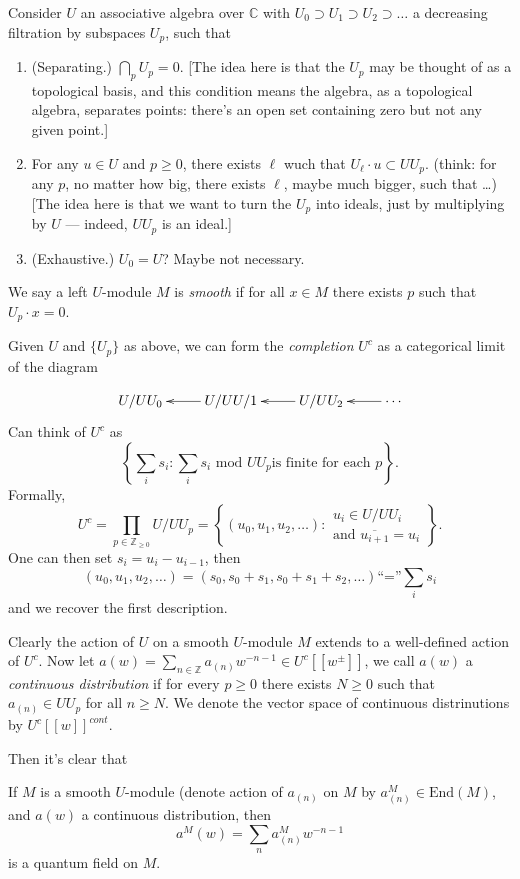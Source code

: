 Consider $U$ an associative algebra over $\mathbb{C}$ with
$U_0 \supset U_1 \supset U_2 \supset\ldots$ a decreasing
filtration by subspaces $U_p$, such that
\begin{enumerate}
\item
\label{item-separating}
(Separating.) $\bigcap_{p}U_p=0$.
[The idea here is that the $U_p$ may be thought of
as a topological basis, and this condition means
the algebra, as a topological algebra, separates points:
there's an open set containing zero but not any given point.]

\item 
\label{item-l}
For any $u \in U$ and $p\geq 0$, there exists $\ell$
wuch that  $U_\ell \cdot u \subset U U_p$.
(think: for any $p$, no matter how big,
there exists $\ell$, maybe much bigger, such that  …)
[The idea here is that we want to turn the  $U_p$ into ideals,
just by multiplying by $U$ --- indeed, $U U_p$ is an ideal.]

\item (Exhaustive.) $U_0= U$? Maybe not necessary.
\label{item-exhaustive}
\end{enumerate}

\noindent
We say a left $U$-module $M$ is {\it smooth} if
for all $x \in M$ there exists $p$ such that $U_p\cdot x=0$.

\medskip\noindent
Given $U$ and $\{U_p\}$ as above, we can form the {\it completion} $U^c$
as a categorical limit of the diagram

$$
\xymatrix{
U/U U_0&U/U U/1 \ar[l]& U/ U U_2 \ar[l]& \cdots \ar[l].
}
$$
Can think of $U^c$ as
$$
\left\{\sum_is_i:\sum_is_i\text{ mod }U U_p
\text{is finite for each $p$}\right\}.
$$
Formally,
$$
U^c=\prod_{p \in \mathbb{Z}_{\geq 0}}U/U U_p
=\left\{(u_0,u_1,u_2,\ldots):\substack{u_i \in U/U U_i \\ 
\text{and }\overline{u_{i+1}}=u_i}\right\}.
$$
One can then set $s_i=u_i-u_{i-1}$, then
$$
(u_0,u_1,u_2,\ldots)=(s_0,s_0+s_1,s_0+s_1+s_2,\ldots)
\text{``=''}\sum_is_i
$$
and we recover the first description.

Clearly the action of $U$ on a smooth $U$-module $M$ 
extends to a well-defined action of $U^c$.
Now let $a(w)=\sum_{n \in \mathbb{Z}}a_{(n)}w^{-n-1}
\in U^c[[w^{\pm}]]$,
we call $a(w)$ a {\it continuous distribution} if
for every $p \geq 0$ there exists $N \geq 0$ such that
$a_{(n)}\in U U_p$ for all $n \geq N$.
We denote the vector space of continuous distrinutions by
$U^c[[w]]^{cont}$.

Then it's clear that
\begin{lemma}
\label{lemma-continuous-distribution-is-quantum}
If $M$ is a smooth $U$-module
(denote action of $a_{(n)}$ on $M$ by $a^M_{(n)}\in \text{End}(M)$,
and $a(w)$ a continuous distribution, then
$$
a^M(w)=\sum_n a_{(n)}^Mw^{-n-1}
$$
is a quantum field on $M$.
\end{lemma}


